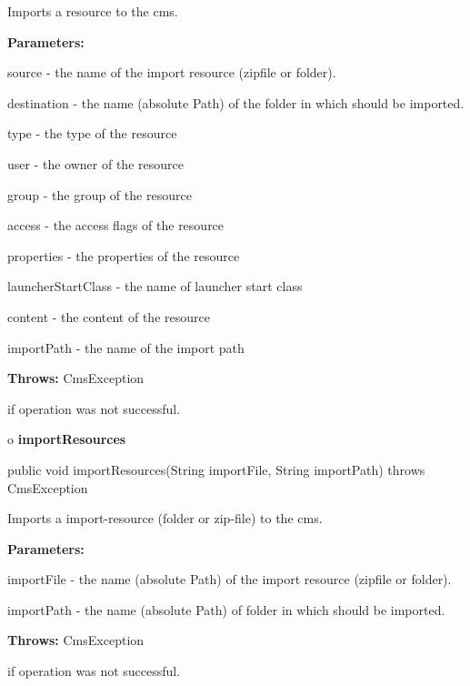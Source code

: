 \begin{description}
\htmlDD Imports a resource to the cms.

\begin{description}
\item {\bf Parameters:}

source - the name of the import resource (zipfile or folder).

destination - the name (absolute Path) of the folder in which should be
imported.

type - the type of the resource

user - the owner of the resource

group - the group of the resource

access - the access flags of the resource

properties - the properties of the resource

launcherStartClass - the name of launcher start class

content - the content of the resource

importPath - the name of the import path
\item {\bf Throws:} CmsException

if operation was not successful.
\end{description}

\end{description}

o {\bf importResources}

\begin{PRE}
 public void importResources(String importFile,
                             String importPath) throws CmsException
\end{PRE}

\begin{description}
\htmlDD Imports a import-resource (folder or zip-file) to the cms.

\begin{description}
\item {\bf Parameters:}

importFile - the name (absolute Path) of the import resource (zipfile or
folder).

importPath - the name (absolute Path) of folder in which should be imported.
\item {\bf Throws:} CmsException

if operation was not successful.
\end{description}

\end{description}

